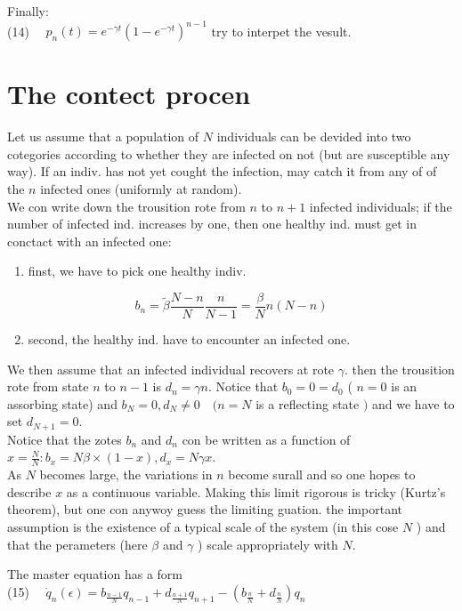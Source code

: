 \documentclass[10pt]{article}
\begin{document}
Finally:\\
(14) $\quad p_{n}(t)=e^{-\gamma t}\left(1-e^{-\gamma t}\right)^{n-1}$ try to interpet the vesult.

\section*{The contect procen}
Let us assume that a population of $N$ individuals can be devided into two cotegories according to whether they are infected on not (but are susceptible any way). If an indiv. has not yet cought the infection, may catch it from any of of the $n$ infected ones (uniformly at random).\\
We con write down the trousition rote from $n$ to $n+1$ infected individuals; if the number of infected ind. increases by one, then one healthy ind. must get in conctact with an infected one:

\begin{enumerate}
  \item finst, we have to pick one healthy indiv.
\end{enumerate}

$$
b_{n}=\tilde{\beta} \frac{N-n}{N} \frac{n}{N-1}=\frac{\beta}{N} n(N-n)
$$

\begin{enumerate}
  \setcounter{enumi}{1}
  \item second, the healthy ind. have to encounter an infected one.
\end{enumerate}

We then assume that an infected individual recovers at rote $\gamma$. then the trousition rote from state $n$ to $n-1$ is $d_{n}=\gamma n$. Notice that $b_{0}=0=d_{0}$ ( $n=0$ is an assorbing state) and $b_{N}=0, d_{N} \neq 0 \quad(n=N$ is a reflecting state $)$ and we have to set $d_{N+1}=0$.\\
Notice that the zotes $b_{n}$ and $d_{n}$ con be written as a function of $x=\frac{N}{N}: b_{x}=N \beta \times(1-x), d_{x}=N \gamma x$.\\
As $N$ becomes large, the variations in $n$ become surall and so one hopes to describe $x$ as a continuous variable. Making this limit rigorous is tricky (Kurtz's theorem), but one con anywoy guess the limiting guation. the important assumption is the existence of a typical scale of the system (in this cose $N$ ) and that the perameters (here $\beta$ and $\gamma$ ) scale appropriately with $N$.

The master equation has a form\\
(15) $\quad \dot{q}_{n}(\epsilon)=b_{\frac{n-1}{N}} q_{n-1}+d_{\frac{n+1}{N}} q_{n+1}-\left(b_{\frac{n}{N}}+d_{\frac{n}{N}}\right) q_{n}$
\end{document}
